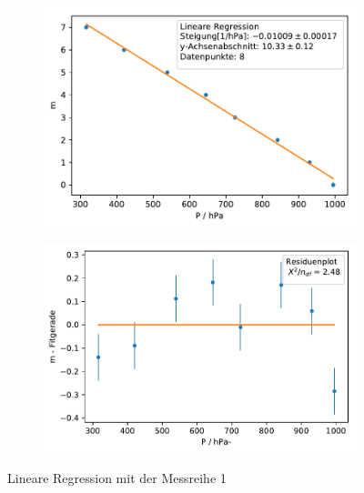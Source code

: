 \documentclass[12pt,a4paper]{article}
\begin{document}
\begin{figure}[H]
	\centering	
	\begin{subfigure}{0.49\textwidth}
	\centering
	\includegraphics[width=\textwidth]{Python/MR1_LinReg.pdf}
	\end{subfigure}
	\begin{subfigure}{0.49\textwidth}
	\centering
	\includegraphics[width=\textwidth]{Python/MR1_Residuen.pdf}
	\end{subfigure}
	\caption{Lineare Regression mit der Messreihe 1}
	\label{MR1_LinReg}
\end{figure}
\end{document}
